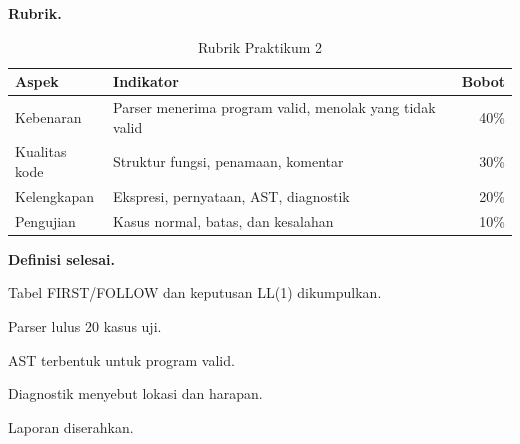 \textbf{Rubrik.}
\begin{table}[H]
\centering
\caption{Rubrik Praktikum 2}
\label{tab:ch10-rubrik}
\begin{tabularx}{\textwidth}{@{}lXr@{}}
\toprule
\textbf{Aspek} & \textbf{Indikator} & \textbf{Bobot} \\
\midrule
Kebenaran & Parser menerima program valid, menolak yang tidak valid &
40\% \\
Kualitas kode & Struktur fungsi, penamaan, komentar & 30\% \\
Kelengkapan & Ekspresi, pernyataan, AST, diagnostik & 20\% \\
Pengujian & Kasus normal, batas, dan kesalahan & 10\% \\
\bottomrule
\end{tabularx}
\end{table}

\textbf{Definisi selesai.}
\begin{checklist}
  \item Tabel FIRST/FOLLOW dan keputusan LL(1) dikumpulkan.
  \item Parser lulus 20 kasus uji.
  \item AST terbentuk untuk program valid.
  \item Diagnostik menyebut lokasi dan harapan.
  \item Laporan diserahkan.
\end{checklist}
